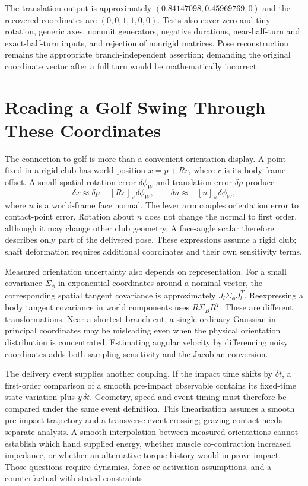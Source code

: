 The translation output is approximately $(0.84147098,0.45969769,0)$ and the recovered coordinates are $(0,0,1,1,0,0)$. Tests also cover zero and tiny rotation, generic axes, nonunit generators, negative durations, near-half-turn and exact-half-turn inputs, and rejection of nonrigid matrices. Pose reconstruction remains the appropriate branch-independent assertion; demanding the original coordinate vector after a full turn would be mathematically incorrect.

\section{Reading a Golf Swing Through These Coordinates}
\label{sec:exponential_golf}

The connection to golf is more than a convenient orientation display. A point fixed in a rigid club has world position $x=p+Rr$, where $r$ is its body-frame offset. A small spatial rotation error $\delta\phi_W$ and translation error $\delta p$ produce
\begin{equation}
 \delta x\approx\delta p-[Rr]_\times\delta\phi_W,\qquad
 \delta n\approx-[n]_\times\delta\phi_W,
 \label{eq:exponential_delivery_sensitivity}
\end{equation}
where $n$ is a world-frame face normal. The lever arm couples orientation error to contact-point error. Rotation about $n$ does not change the normal to first order, although it may change other club geometry. A face-angle scalar therefore describes only part of the delivered pose. These expressions assume a rigid club; shaft deformation requires additional coordinates and their own sensitivity terms.

Measured orientation uncertainty also depends on representation. For a small covariance $\Sigma_\phi$ in exponential coordinates around a nominal vector, the corresponding spatial tangent covariance is approximately $J_l\Sigma_\phi J_l^T$. Reexpressing a body tangent covariance in world components uses $R\Sigma_B R^T$. These are different transformations. Near a shortest-branch cut, a single ordinary Gaussian in principal coordinates may be misleading even when the physical orientation distribution is concentrated. Estimating angular velocity by differencing noisy coordinates adds both sampling sensitivity and the Jacobian conversion.

The delivery event supplies another coupling. If the impact time shifts by $\delta t$, a first-order comparison of a smooth pre-impact observable contains its fixed-time state variation plus $\dot y\,\delta t$. Geometry, speed and event timing must therefore be compared under the same event definition. This linearization assumes a smooth pre-impact trajectory and a transverse event crossing; grazing contact needs separate analysis. A smooth interpolation between measured orientations cannot establish which hand supplied energy, whether muscle co-contraction increased impedance, or whether an alternative torque history would improve impact. Those questions require dynamics, force or activation assumptions, and a counterfactual with stated constraints.

